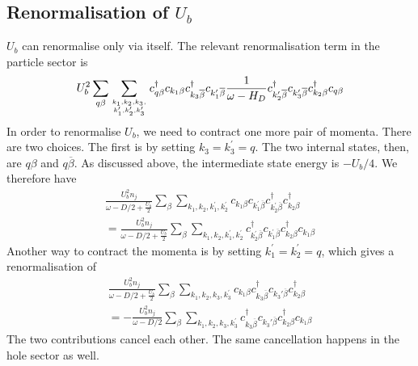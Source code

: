 \documentclass[reprint,superscriptaddress,floatfix]{revtex4-2}
\begin{document}
\subsection{Renormalisation of \(U_b\)}
\(U_b\) can renormalise only via itself. The relevant renormalisation term in the particle sector is
\begin{equation}\begin{aligned}
	U_b^2 \sum_{q\beta}\sum_{k_1,k_2,k_3,\atop{k_1^\prime,k_2^\prime,k_3^\prime}} c^\dagger_{q\beta}c_{k_1\beta}c^\dagger_{k_3\overline\beta}c_{k_1^\prime\overline\beta}\frac{1}{\omega - H_D}c^\dagger_{k_2^\prime\overline\beta}c_{k_3^\prime\overline\beta}c^\dagger_{k_2\beta}c_{q\beta}
\end{aligned}\end{equation}
In order to renormalise \(U_b\), we need to contract one more pair of momenta. There are two choices. The first is by setting \(k_3 = k_3^\prime = q\). The two internal states, then, are \(q\beta\) and \(q\overline\beta\). As discussed above, the intermediate state energy is \(-U_b/4\). We therefore have
\begin{equation}\begin{aligned}
	\frac{U_b^2 n_j}{\omega - D/2 + \frac{U_b}{2}}\sum_{\beta}\sum_{k_1,k_2,k_1^\prime,k_2^\prime} c_{k_1\beta}c_{k_1^\prime\overline\beta}c^\dagger_{k_2^\prime\overline\beta}c^\dagger_{k_2\beta} \\
	= \frac{U_b^2 n_j}{\omega - D/2 + \frac{U_b}{2}}\sum_{\beta}\sum_{k_1,k_2,k_1^\prime,k_2^\prime} c^\dagger_{k_2^\prime\overline\beta}c_{k_1^\prime\overline\beta}c^\dagger_{k_2\beta}c_{k_1\beta}
\end{aligned}\end{equation}
Another way to contract the momenta is by setting \(k_1^\prime = k_2^\prime = q\), which gives a renormalisation of
\begin{equation}\begin{aligned}
	\frac{U_b^2 n_j}{\omega - D/2 + \frac{U_b}{2}}\sum_{\beta}\sum_{k_1,k_2,k_3,k_3^\prime} c_{k_1\beta}c^\dagger_{k_3 \overline\beta}c_{k_3\prime\overline\beta}c^\dagger_{k_2\beta} \\
	= -\frac{U_b^2 n_j}{\omega - D/2}\sum_{\beta}\sum_{k_1,k_2,k_3,k_3^\prime} c^\dagger_{k_3 \overline\beta}c_{k_3\prime\overline\beta}c^\dagger_{k_2\beta}c_{k_1\beta}
\end{aligned}\end{equation}
The two contributions cancel each other. The same cancellation happens in the hole sector as well.
\end{document}
